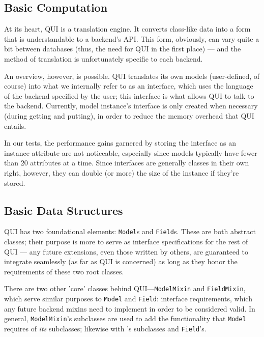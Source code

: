 \documentclass{article} %
\newcommand{\il}[1]{\mbox{\lstinline{#1}}}
\begin{document}
\subsection{Basic Computation}
At its heart, QUI is a translation engine. It converts class-like data into a form that is understandable to a backend's API. This form, obviously, can
vary quite a bit between databases (thus, the need for QUI in the first place) --- and the method of translation is unfortunately specific to each
backend.

An overview, however, is possible. QUI translates its own models (user-defined, of course) into what we internally refer to as an interface, which uses
the language of the backend specified by the user; this interface is what allows QUI to talk to the backend. Currently, model instance's interface is only 
created when necessary (during getting and putting), in order to reduce the memory overhead that QUI entails. 

In our tests, the performance gains garnered by storing the interface as an instance attribute are not noticeable, especially since models typically 
have fewer than 20 attributes at a time. Since interfaces are generally classes in their own right, however, they can double (or more) the size of 
the instance if they're stored.

\subsection{Basic Data Structures}
QUI has two foundational elements: \il{Model}s and \il{Field}s. These are both abstract classes; their purpose is more to serve as interface specifications
for the rest of QUI --- any future extensions, even those written by others, are guaranteed to integrate seamlessly (as far as QUI is concerned)
as long as they honor the requirements of these two root classes. 

There are two other 'core' classes behind QUI---\il{ModelMixin} and \il{FieldMixin}, which serve similar purposes to \il{Model} and \il{Field}: interface
 requirements, which any future backend mixins need to implement in order to be considered valid. In general, \il{ModelMixin}'s subclasses are used
to add the functionality that \il{Model} requires of \emph{its} subclasses; likewise with 's subclasses and \il{Field}'s.
\end{document}
